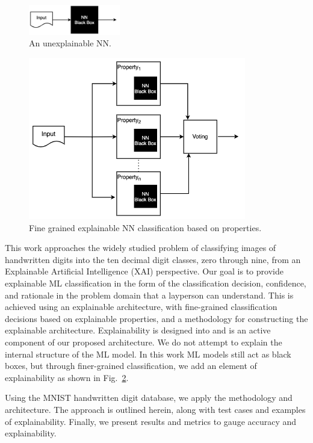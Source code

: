 \documentclass[conference]{IEEEtran}
\begin{document}
\begin{figure}[htbp]
\centerline{\includegraphics[width=40mm]{./images/unexplainable.png}}
\caption{An unexplainable NN.}
\label{unexplainable}
\end{figure}

\begin{figure}[htbp]
\centerline{\includegraphics[width=95mm]{./images/explainable.png}}
\caption{Fine grained explainable NN classification based on properties.}
\label{explainable}
\end{figure}

This work approaches the widely studied problem of classifying images of handwritten digits into the ten decimal digit classes, zero through nine, from an Explainable Artificial Intelligence (XAI) perspective.  Our goal is to provide explainable ML classification in the form of the classification decision, confidence, and rationale in the problem domain that a layperson can understand.  This is achieved using an explainable architecture, with fine-grained classification decisions based on explainable properties, and a methodology for constructing the explainable architecture.  Explainability is designed into and is an active component of our proposed architecture\cite{Arrieta2020ExplainableAI}.   We do not attempt to explain the internal structure of the ML model.  In this work ML models still act as black boxes, but through finer-grained classification, we add an element of explainability as shown in Fig.~\ref{explainable}.

Using the MNIST\cite{deng2012mnist} handwritten digit database, we apply the methodology and architecture.  The approach is outlined herein, along with test cases and examples of explainability.  Finally, we present results and metrics to gauge accuracy and explainability.
\end{document}
